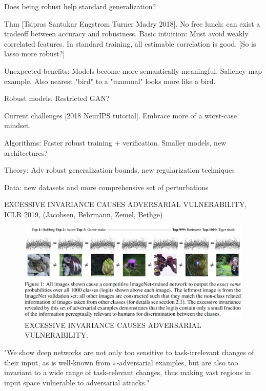 \documentclass[english]{article}
\begin{document}
\item Does being robust help standard generalization? 


Thm [Tsipras Santukar Engstrom Turner Madry 2018]. No free lunch: can exist a tradeoff between accuracy and robustness. Basic intuition: Must avoid weakly correlated features. In standard training, all estimable correlation is good. [So is lasso more robust?]

\item Unexpected benefits: Models become more semantically meaningful. Saliency map example. Also nearest "bird" to a "mammal" looks more like a bird. 

Robust models. Restricted GAN?


\eenum
\item Current challenges [2018 NeurIPS tutorial]. Embrace more of a worst-case mindset.


\benum 
\item Algorithms: Faster robust training + verification. Smaller models, new architectures?

\item Theory: Adv robust generalization bounds, new regularization techniques

\item Data: new datasets and more comprehensive set of perturbations

\eenum

\item EXCESSIVE INVARIANCE CAUSES ADVERSARIAL
VULNERABILITY, ICLR 2019, (Jacobsen, Behrmann, Zemel, Bethge)

  \begin{figure}
        \centering
        \includegraphics[scale = 0.35]{inv}
        
        \caption{EXCESSIVE INVARIANCE CAUSES ADVERSARIAL
VULNERABILITY.}
        \label{inv}
    \end{figure}


"We show
deep networks are not only too sensitive to task-irrelevant changes of their input,
as is well-known from $\varepsilon$-adversarial examples, but are also too invariant to a wide
range of task-relevant changes, thus making vast regions in input space vulnerable
to adversarial attacks."
\end{document}
